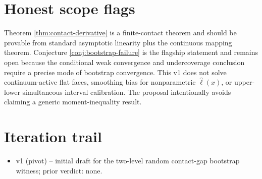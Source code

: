 \documentclass[11pt]{article}
\theoremstyle{definition}
\theoremstyle{plain}
\theoremstyle{remark}
\begin{document}
\section{Honest scope flags}
Theorem \ref{thm:contact-derivative} is a finite-contact theorem and should be provable from standard asymptotic linearity plus the continuous mapping theorem. Conjecture \ref{conj:bootstrap-failure} is the flagship statement and remains open because the conditional weak convergence and undercoverage conclusion require a precise mode of bootstrap convergence. This v1 does not solve continuum-active flat faces, smoothing bias for nonparametric \(\widehat\ell(x)\), or upper-lower simultaneous interval calibration. The proposal intentionally avoids claiming a generic moment-inequality result.

\section{Iteration trail}
\begin{itemize}[leftmargin=*]
\item v1 (pivot) -- initial draft for the two-level random contact-gap bootstrap witness; prior verdict: none.
\end{itemize}
\end{document}
